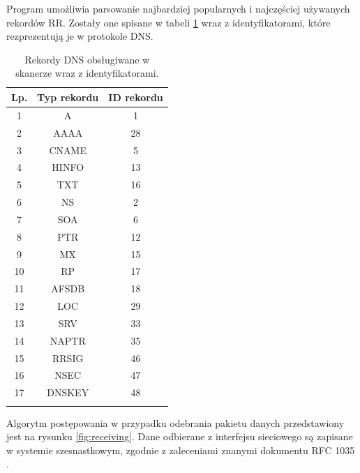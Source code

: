 Program umożliwia parsowanie najbardziej popularnych i najczęściej używanych rekordów RR. Zostały one spisane w tabeli \ref{records}
wraz z identyfikatorami, które rezprezentują je w protokole DNS.

\begin{longtable}{|c|c|c|}
	\hline
	\textbf{Lp.} &
	\textbf{Typ rekordu} &
	\textbf{ID rekordu} \\ \hline\hline
	1 & A & 1 \\
	2 & AAAA & 28 \\
    3 & CNAME & 5 \\
	4 & HINFO & 13 \\
	5 & TXT & 16 \\
	6 & NS & 2 \\
	7 & SOA & 6 \\
	8 & PTR & 12 \\
	9 & MX & 15 \\
	10 & RP & 17 \\
	11 & AFSDB & 18 \\
	12 & LOC & 29 \\
	13 & SRV & 33 \\
	14 & NAPTR & 35 \\
	15 & RRSIG & 46 \\
	16 & NSEC & 47 \\
	17 & DNSKEY & 48 \\
	\hline
	\caption{Rekordy DNS obsługiwane w skanerze wraz z identyfikatorami.}
	\label{records}
\end{longtable}

Algorytm postępowania w przypadku odebrania pakietu danych przedstawiony jest na rysunku \ref{fig:receiving}. Dane odbierane z interfejsu
sieciowego są zapisane w systemie szesnastkowym, zgodnie z zaleceniami znanymi dokumentu RFC 1035 \cite{RFC1035}.

